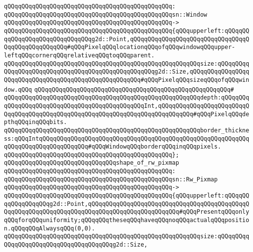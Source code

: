 \verb|qQQqqQQqqQQqqQQqqQQqqQQqqQQqqQQqqQQqqQQqqQQqqQQq:|\newline
\verb|qQQqqQQqqQQqqQQqqQQqqQQqqQQqqQQqqQQqqQQqqQQqqQQqsn::Window|\newline
\verb|qQQqqQQqqQQqqQQqqQQqqQQqqQQqqQQqqQQqqQQqqQQqqQQq->|\newline
\verb|qQQqqQQqqQQqqQQqqQQqqQQqqQQqqQQqqQQqqQQqqQQqqQQq{qQQqupperleft:qQQqqQQqqQQqqQQqqQQqqQQqqQQqqQQqg2d::Point,qQQqqQQqqQQqqQQqqQQqqQQqqQQqqQQqqQQqqQQqqQQqqQQqqQQq#qQQqPixelqQQqlocationqQQqofqQQqwindowqQQqupper-leftqQQqcornerqQQqrelativeqQQqtoqQQqparent.|\newline
\verb|qQQqqQQqqQQqqQQqqQQqqQQqqQQqqQQqqQQqqQQqqQQqqQQqqQQqqQQqsize:qQQqqQQqqQQqqQQqqQQqqQQqqQQqqQQqqQQqqQQqqQQqqQQqqQQqg2d::Size,qQQqqQQqqQQqqQQqqQQqqQQqqQQqqQQqqQQqqQQqqQQqqQQqqQQqqQQq#qQQqPixelqQQqsizeqQQqofqQQqwindow.qQQq|\newline
\verb|qQQqqQQqqQQqqQQqqQQqqQQqqQQqqQQqqQQqqQQqqQQqqQQqqQQqqQQq#|\newline
\verb|qQQqqQQqqQQqqQQqqQQqqQQqqQQqqQQqqQQqqQQqqQQqqQQqqQQqqQQqdepth:qQQqqQQqqQQqqQQqqQQqqQQqqQQqqQQqqQQqqQQqqQQqqQQqInt,qQQqqQQqqQQqqQQqqQQqqQQqqQQqqQQqqQQqqQQqqQQqqQQqqQQqqQQqqQQqqQQqqQQqqQQqqQQqqQQq#qQQqPixelqQQqdepthqQQqinqQQqbits.|\newline
\verb|qQQqqQQqqQQqqQQqqQQqqQQqqQQqqQQqqQQqqQQqqQQqqQQqqQQqqQQqborder_thickness:qQQqIntqQQqqQQqqQQqqQQqqQQqqQQqqQQqqQQqqQQqqQQqqQQqqQQqqQQqqQQqqQQqqQQqqQQqqQQqqQQqqQQqqQQq#qQQqWindowqQQqborderqQQqinqQQqpixels.|\newline
\verb|qQQqqQQqqQQqqQQqqQQqqQQqqQQqqQQqqQQqqQQqqQQqqQQq};|\newline
\newline
\verb|qQQqqQQqqQQqqQQqqQQqqQQqqQQqqQQqshape_of_rw_pixmap|\newline
\verb|qQQqqQQqqQQqqQQqqQQqqQQqqQQqqQQqqQQqqQQqqQQqqQQq:|\newline
\verb|qQQqqQQqqQQqqQQqqQQqqQQqqQQqqQQqqQQqqQQqqQQqqQQqsn::Rw_Pixmap|\newline
\verb|qQQqqQQqqQQqqQQqqQQqqQQqqQQqqQQqqQQqqQQqqQQqqQQq->|\newline
\verb|qQQqqQQqqQQqqQQqqQQqqQQqqQQqqQQqqQQqqQQqqQQqqQQq{qQQqupperleft:qQQqqQQqqQQqqQQqqQQqg2d::Point,qQQqqQQqqQQqqQQqqQQqqQQqqQQqqQQqqQQqqQQqqQQqqQQqqQQqqQQqqQQqqQQqqQQqqQQqqQQqqQQqqQQqqQQqqQQqqQQq#qQQqPresentqQQqonlyqQQqforqQQquniformity;qQQqqQQqtheseqQQqhaveqQQqnoqQQqactualqQQqposition.qQQqqQQqAlwaysqQQq(0,0).|\newline
\verb|qQQqqQQqqQQqqQQqqQQqqQQqqQQqqQQqqQQqqQQqqQQqqQQqqQQqqQQqsize:qQQqqQQqqQQqqQQqqQQqqQQqqQQqqQQqqQQqqQQqg2d::Size,|\newline
